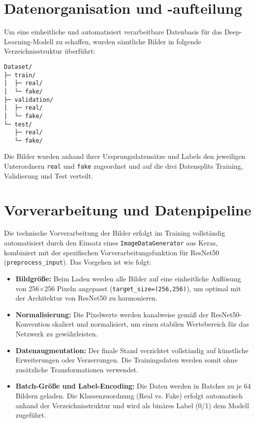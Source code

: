 \section{Datenorganisation und -aufteilung}

Um eine einheitliche und automatisiert verarbeitbare Datenbasis für das Deep-Learning-Modell zu schaffen, wurden sämtliche Bilder in folgende Verzeichnisstruktur überführt:

\begin{verbatim}
Dataset/
├─ train/
│  ├─ real/
│  └─ fake/
├─ validation/
│  ├─ real/
│  └─ fake/
└─ test/
   ├─ real/
   └─ fake/
\end{verbatim}

Die Bilder wurden anhand ihrer Ursprungsdatensätze und Labels den jeweiligen Unterordnern \texttt{real} und \texttt{fake} zugeordnet und auf die drei Datensplits Training, Validierung und Test verteilt.

\section{Vorverarbeitung und Datenpipeline}

Die technische Vorverarbeitung der Bilder erfolgt im Training vollständig automatisiert durch den Einsatz eines \texttt{ImageDataGenerator} aus Keras, kombiniert mit der spezifischen Vorverarbeitungsfunktion für ResNet50 (\texttt{preprocess\_input}). Das Vorgehen ist wie folgt:

\begin{itemize}
    \item \textbf{Bildgröße:}  
    Beim Laden werden alle Bilder auf eine einheitliche Auflösung von 256×256 Pixeln angepasst (\texttt{target_size=(256,256)}), um optimal mit der Architektur von ResNet50 zu harmonieren.

    \item \textbf{Normalisierung:}  
    Die Pixelwerte werden kanalweise gemäß der ResNet50-Konvention skaliert und normalisiert, um einen stabilen Wertebereich für das Netzwerk zu gewährleisten.

    \item \textbf{Datenaugmentation:}  
    Der finale Stand verzichtet vollständig auf künstliche Erweiterungen oder Verzerrungen. Die Trainingsdaten werden somit ohne zusätzliche Transformationen verwendet.

    \item \textbf{Batch-Größe und Label-Encoding:}  
    Die Daten werden in Batches zu je 64 Bildern geladen. Die Klassenzuordnung (Real vs. Fake) erfolgt automatisch anhand der Verzeichnisstruktur und wird als binäres Label (0/1) dem Modell zugeführt.
\end{itemize}

